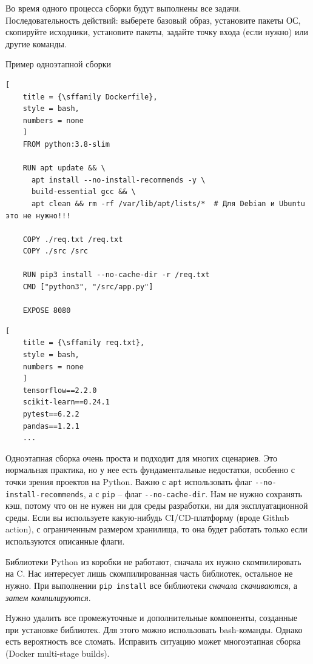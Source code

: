 \documentclass[%
	11pt,
	a4paper,
	utf8,
		]{article}
\begin{document}
Во время одного процесса сборки будут выполнены все задачи. Последовательность действий: выберете базовый образ, установите пакеты ОС, скопируйте исходники, установите пакеты, задайте точку входа (если нужно) или другие команды.

Пример одноэтапной сборки

\begin{minipage}[t]{0.55\textwidth}
	\begin{lstlisting}[
	title = {\sffamily Dockerfile},
	style = bash,
	numbers = none	
	]
	FROM python:3.8-slim
	
	RUN apt update && \
	  apt install --no-install-recommends -y \
	  build-essential gcc && \
	  apt clean && rm -rf /var/lib/apt/lists/*  # Для Debian и Ubuntu это не нужно!!!
	  
	COPY ./req.txt /req.txt
	COPY ./src /src
	
	RUN pip3 install --no-cache-dir -r /req.txt
	CMD ["python3", "/src/app.py"]
	
	EXPOSE 8080
	\end{lstlisting}
\end{minipage}
\hspace*{5mm}
\begin{minipage}[t]{0.4\textwidth}
	\begin{lstlisting}[
	title = {\sffamily req.txt},
	style = bash,
	numbers = none	
	]
	tensorflow==2.2.0
	scikit-learn==0.24.1
	pytest==6.2.2
	pandas==1.2.1
	...
	\end{lstlisting}
\end{minipage}

Одноэтапная сборка очень проста и подходит для многих сценариев. Это нормальная практика, но у нее есть фундаментальные недостатки, особенно с точки зрения проектов на Python. Важно с \texttt{apt} использовать флаг \verb|--no-install-recommends|, а с \texttt{pip} -- флаг \verb|--no-cache-dir|. Нам не нужно сохранять кэш, потому что он не нужен ни для среды разработки, ни для эксплуатационной среды. Если вы используете какую-нибудь CI/CD-платформу (вроде Github action), с ограниченным размером хранилища, то она будет работать только если используются описанные флаги.

Библиотеки Python из коробки не работают, сначала их нужно скомпилировать на C. Нас интересует лишь скомпилированная часть библиотек, остальное не нужно. При выполнении \texttt{pip install} все библиотеки \emph{сначала скачиваются}, а \emph{затем компилируются}.

Нужно удалить все промежуточные и дополнительные компоненты, созданные при установке библиотек. Для этого можно использовать bash-команды. Однако есть вероятность все сломать. Исправить ситуацию может многоэтапная сборка (Docker multi-stage builds).
\end{document}
